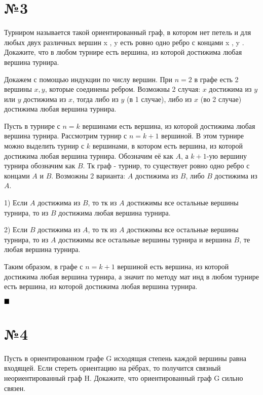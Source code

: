 \documentclass[a4paper, 16pt]{article}
\newenvironment{proof}[1][Доказательство]{%
	\begin{trivlist}
		\item[\hskip \labelsep {\bfseries #1:}]
		\item \hspace{14pt}
	}{
		$ \hfill\blacksquare $
	\end{trivlist}
	\hfill\break
}
\begin{document}
	\section*{№3}
	
		Турниром
		называется такой ориентированный граф, в котором нет петель и для любых двух различных вершин
		x
		,
		y
		есть ровно одно ребро с концами
		x
		,
		y
		.
		Докажите, что в любом турнире есть вершина, из которой достижима любая вершина турнира.
		
		\begin{proof}
			Докажем с помощью индукции по числу вершин. При $n=2$ в графе есть 2 вершины $x, y$, которые соединены ребром. Возможны 2 случая: $x$ достижима из $y$ или $y$ достижима из $x$, тогда либо из $y$ (в 1 случае), либо из $x$ (во 2 случае) достижима любая вершина турнира.
			
			Пусть в турнире с $n=k$ вершинами есть вершина, из которой достижима любая вершина турнира. Рассмотрим турнир с $n=k+1$ вершиной. В этом турнире можно выделить турнир с $k$ вершинами, в котором есть вершина, из которой достижима любая вершина турнира. Обозначим её как $A$, а $k+1$-ую вершину турнира обозначим как $B$. Тк граф - турнир, то существует ровно одно ребро с концами $A$ и $B$. Возможны 2 варианта: $A$ достижима из $B$, либо $B$ достижима из $A$.
			
			1) Если $A$ достижима из $B$, то тк из $A$ достижимы все остальные вершины турнира, то из $B$ достижима любая вершина турнира.
			
			2) Если $B$ достижима из $A$, то тк из $A$ достижимы все остальные вершины турнира, то из $A$ достижимы все остальные вершины турнира и вершина $B$, те любая вершина турнира.
			
			Таким образом, в графе с $n=k+1$ вершиной есть вершина, из которой достижима любая вершина турнира, а значит по методу мат инд в любом турнире есть вершина, из которой достижима любая вершина турнира.
		\end{proof}
	
	\section*{№4}
	
		Пусть в ориентированном графе
		G
		исходящая степень каждой вершины равна входящей. Если стереть ориентацию на рёбрах, то получится связный неориентированный граф
		H. Докажите, что ориентированный граф
		G
		сильно связен.
		
\end{document}
